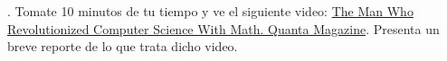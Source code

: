 . Tomate 10 minutos de tu tiempo y ve el siguiente video:
\href{https://www.youtube.com/watch?v=rkZzg7Vowao}{The Man
  Who Revolutionized Computer Science With Math. Quanta Magazine}.
Presenta un breve reporte de lo que trata dicho video.
